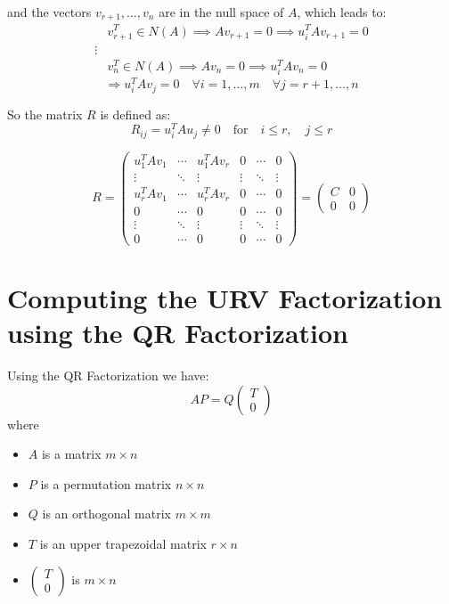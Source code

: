 \documentclass[a4paper, 12pt]{article}
\begin{document}
and the vectors \( v_{r+1}, \ldots, v_n \) are in the null space of \( A \), which leads to:
\[
\begin{aligned}
&v_{r+1}^T \in N(A) \implies Av_{r+1} = 0 \implies u_i^T A v_{r+1} = 0 \\
\vdots \\
&v_n^T \in N(A) \implies Av_n = 0 \implies u_i^T A v_n = 0
\end{aligned}
\]
$$ \Rightarrow u_i^TAv_j = 0 \quad \forall i = 1, \dots, m \quad \forall j = r+1, \dots, n $$

So the matrix $R$ is defined as:
\[ R_{ij} = u_i^T A u_j \neq 0 \quad \text{for} \quad i \leq r, \quad j \leq r \]

\[
R = \begin{pmatrix}
u_1^T A v_1 & \cdots & u_1^T A v_r & 0 & \cdots & 0 \\
\vdots & \ddots & \vdots & \vdots & \ddots & \vdots \\
u_r^T A v_1 & \cdots & u_r^T A v_r & 0 & \cdots & 0 \\
0 & \cdots & 0 & 0 & \cdots & 0 \\
\vdots & \ddots & \vdots & \vdots & \ddots & \vdots \\
0 & \cdots & 0 & 0 & \cdots & 0
\end{pmatrix}
= \begin{pmatrix} C & 0 \\ 0 & 0 \end{pmatrix}
\]


\section{Computing the URV Factorization using the QR Factorization}
Using the QR Factorization we have:
\[ A P = Q \begin{pmatrix} T \\ 0 \end{pmatrix} \]
where
\begin{itemize}
    \item $A$ is a matrix $m \times n$
    \item $P$ is a permutation matrix $n \times n$
    \item $Q$ is an orthogonal matrix $m \times m$
    \item $T$ is an upper trapezoidal matrix $r \times n$
    \item $\begin{pmatrix} T \\ 0 \end{pmatrix}$ is $m \times n$
\end{itemize}
\end{document}
